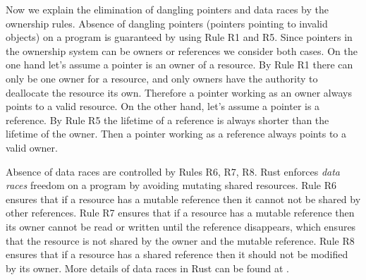 \documentclass[runningheads]{llncs}
\begin{document}


Now we explain the elimination of dangling pointers and data races by the ownership rules.
Absence of dangling pointers (pointers pointing to invalid objects) on a program is guaranteed by using Rule R1 and R5. 
Since pointers in the ownership system can be owners or references we consider both cases.
On the one hand let's assume a pointer is an owner of a resource. By Rule R1 there can only be one owner for a resource, and only owners have the authority to deallocate the resource its own. Therefore a pointer working as an owner always points to a valid resource.
On the other hand, let's assume a pointer is a reference. By Rule R5 the lifetime of a reference is always shorter than the lifetime of the owner. Then a pointer working as a reference always points to a valid owner.



Absence of data races are controlled by Rules R6, R7, R8. 
Rust enforces \emph{data races} freedom on a program by avoiding mutating shared resources.
Rule R6 ensures that if a resource has a mutable reference then it cannot not be shared by other references.
Rule R7 ensures that if a resource has a mutable reference then its owner cannot be 
read or written until the reference disappears, which ensures that the resource is not shared by the owner and the mutable reference.
Rule R8 ensures that if a resource has a shared reference then it should not be modified
 by its owner.
More details of data races in Rust can be found at \cite{rustdatarace}.
\end{document}
